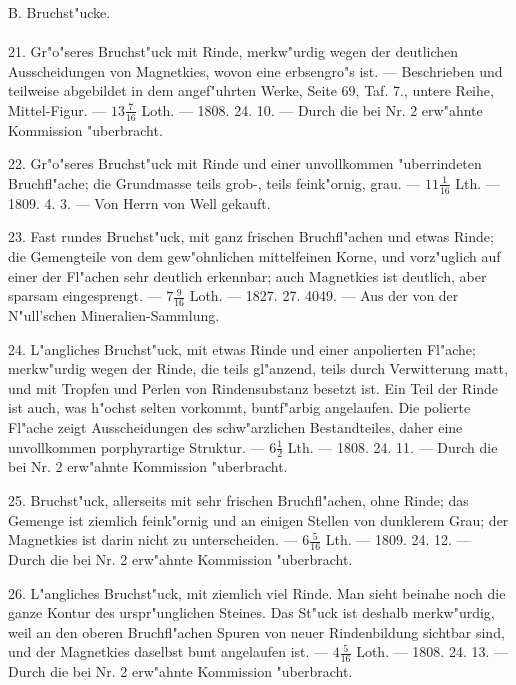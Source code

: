 \documentclass[a4paper, 11pt, oneside, polutonikogreek, german]{article}
\begin{document}
\begin{center}
B. Bruchst"ucke.
\end{center}
\paragraph{}
21. Gr"o"seres Bruchst"uck mit Rinde, merkw"urdig wegen der deutlichen Ausscheidungen von Magnetkies, wovon eine erbsengro"s ist. --- Beschrieben und teilweise abgebildet in dem angef"uhrten Werke, Seite 69, Taf. 7., untere Reihe, Mittel-Figur. --- $13\frac{7}{16}$ Loth. --- 1808. 24. 10. --- Durch die bei Nr. 2 erw"ahnte Kommission "uberbracht.

22. Gr"o"seres Bruchst"uck mit Rinde und einer unvollkommen "uberrindeten Bruchfl"ache; die Grundmasse teils grob-, teils feink"ornig, grau. --- $11\frac{1}{16}$ Lth. --- 1809. 4. 3. --- Von Herrn von Well gekauft.

23. Fast rundes Bruchst"uck, mit ganz frischen Bruchfl"achen und etwas Rinde; die Gemengteile von dem gew"ohnlichen mittelfeinen Korne, und vorz"uglich auf einer der Fl"achen sehr deutlich erkennbar; auch Magnetkies ist deutlich, aber sparsam eingesprengt. --- $7\frac{9}{16}$ Loth. --- 1827. 27. 4049. --- Aus der von der N"ull’schen Mineralien-Sammlung.

24. L"angliches Bruchst"uck, mit etwas Rinde und einer anpolierten Fl"ache; merkw"urdig wegen der Rinde, die teils gl"anzend, teils durch Verwitterung matt, und mit Tropfen und Perlen von Rindensubstanz besetzt ist. Ein Teil der Rinde ist auch, was h"ochst selten vorkommt, buntf"arbig angelaufen. Die polierte Fl"ache zeigt Ausscheidungen des schw"arzlichen Bestandteiles, daher eine unvollkommen porphyrartige Struktur. --- $6\frac{1}{2}$ Lth. --- 1808. 24. 11. --- Durch die bei Nr. 2 erw"ahnte Kommission "uberbracht.

25. Bruchst"uck, allerseits mit sehr frischen Bruchfl"achen, ohne Rinde; das Gemenge ist ziemlich feink"ornig und an einigen Stellen von dunklerem Grau; der Magnetkies ist darin nicht zu unterscheiden. --- $6\frac{5}{16}$ Lth. --- 1809. 24. 12. --- Durch die bei Nr. 2 erw"ahnte Kommission "uberbracht.

26. L"angliches Bruchst"uck, mit ziemlich viel Rinde. Man sieht beinahe noch die ganze Kontur des urspr"unglichen Steines. Das St"uck ist deshalb merkw"urdig, weil an den oberen Bruchfl"achen Spuren von neuer Rindenbildung sichtbar sind, und der Magnetkies daselbst bunt angelaufen ist. --- $4\frac{5}{16}$ Loth. --- 1808. 24. 13. --- Durch die bei Nr. 2 erw"ahnte Kommission "uberbracht.
\end{document}
